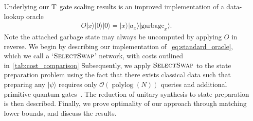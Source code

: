 \documentclass[a4paper,onecolumn,10pt,accepted=2024-05-22]{quantumarticle}
\newcommand{\ket}[1]{| #1\rangle}        %
\newcommand{\op}[1]{\operatorname{#1}}
\begin{document}
	Underlying our $\textsc{T}$ gate scaling results is an improved implementation of a data-lookup oracle
	\begin{align}
	\label{eq:standard_oracle}
	O\ket{x}\ket{0}\ket{0}=\ket{x}\ket{a_x}\ket{\mathrm{garbage}_x}.
	\end{align}
	Note the attached garbage state may always be uncomputed by applying $O$ in reverse. We begin by describing our implementation of~\cref{eq:standard_oracle}, which we call a `$\textsc{SelectSwap}$' network, with costs outlined in~\cref{tab:cost_comparison}
%
%
 Subsequently, we apply $\textsc{SelectSwap}$ to the state preparation problem using the fact that there exists classical data such that preparing any $\ket{\psi}$ requires only $\mathcal{O}(\op{polylog}(N))$ queries and additional primitive quantum gates~\cite{Aaronson2016complexity}. The reduction of unitary synthesis to state preparation is then described. Finally, we prove optimality of our approach through matching lower bounds, and discuss the results. 
\end{document}
